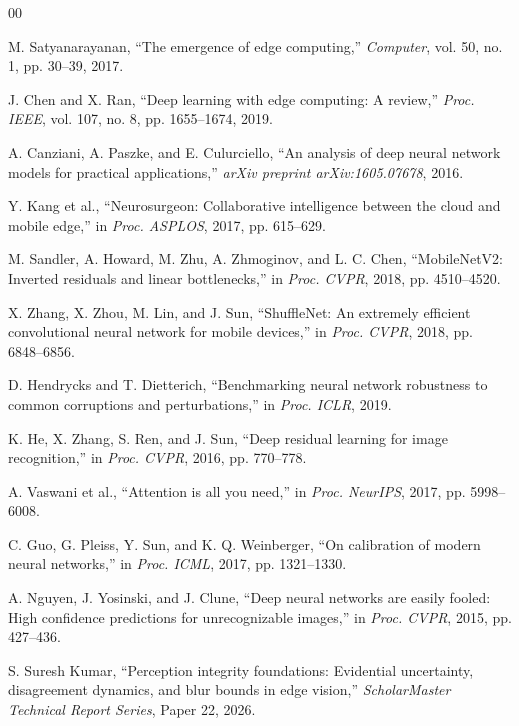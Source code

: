 \documentclass[conference]{IEEEtran}
\begin{document}
\begin{thebibliography}{00}

 M. Satyanarayanan, ``The emergence of edge computing,'' \emph{Computer}, vol. 50, no. 1, pp. 30--39, 2017.

 J. Chen and X. Ran, ``Deep learning with edge computing: A review,'' \emph{Proc. IEEE}, vol. 107, no. 8, pp. 1655--1674, 2019.

 A. Canziani, A. Paszke, and E. Culurciello, ``An analysis of deep neural network models for practical applications,'' \emph{arXiv preprint arXiv:1605.07678}, 2016.

 Y. Kang et al., ``Neurosurgeon: Collaborative intelligence between the cloud and mobile edge,'' in \emph{Proc. ASPLOS}, 2017, pp. 615--629.

 M. Sandler, A. Howard, M. Zhu, A. Zhmoginov, and L. C. Chen, ``MobileNetV2: Inverted residuals and linear bottlenecks,'' in \emph{Proc. CVPR}, 2018, pp. 4510--4520.

 X. Zhang, X. Zhou, M. Lin, and J. Sun, ``ShuffleNet: An extremely efficient convolutional neural network for mobile devices,'' in \emph{Proc. CVPR}, 2018, pp. 6848--6856.

 D. Hendrycks and T. Dietterich, ``Benchmarking neural network robustness to common corruptions and perturbations,'' in \emph{Proc. ICLR}, 2019.

 K. He, X. Zhang, S. Ren, and J. Sun, ``Deep residual learning for image recognition,'' in \emph{Proc. CVPR}, 2016, pp. 770--778.

 A. Vaswani et al., ``Attention is all you need,'' in \emph{Proc. NeurIPS}, 2017, pp. 5998--6008.

 C. Guo, G. Pleiss, Y. Sun, and K. Q. Weinberger, ``On calibration of modern neural networks,'' in \emph{Proc. ICML}, 2017, pp. 1321--1330.

 A. Nguyen, J. Yosinski, and J. Clune, ``Deep neural networks are easily fooled: High confidence predictions for unrecognizable images,'' in \emph{Proc. CVPR}, 2015, pp. 427--436.

 S. Suresh Kumar, ``Perception integrity foundations: Evidential uncertainty, disagreement dynamics, and blur bounds in edge vision,'' \emph{ScholarMaster Technical Report Series}, Paper 22, 2026.


\end{thebibliography}
\end{document}
